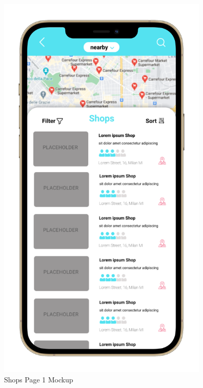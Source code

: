 \begin{figure}
\begin{minipage}{.45\linewidth}
    \includegraphics[width=0.9\textwidth]{Images/UserInterfaces/withiphonephrames/ShopsPage1_iphone12promaxgold_portrait.png}
    \caption{\label{fig:InterfacesDiagram}{Shops Page 1 Mockup}}
\end{minipage}
\end{figure}


